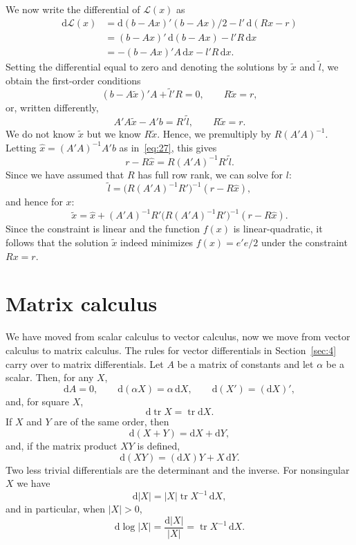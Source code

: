 \documentclass[12pt,a4paper]{article}
\theoremstyle{definition}
\DeclareMathOperator{\tr}{tr}
\newcommand{\dd}{\mathrm{d}}
\begin{document}
We now write the differential of $\mathcal{L}(x)$ as
\begin{align*}
\dd\mathcal{L}(x) &= \dd(b-Ax)'(b-Ax)/2 - l'\, \dd(Rx - r) \\
&= (b-Ax)'\, \dd(b-Ax) - l'R\, \dd x \\
&= -(b-Ax)'A\, \dd x - l'R\, \dd x.
\end{align*}
Setting the differential equal to zero and denoting the solutions by $\tilde{x}$ and $\tilde{l}$, we obtain the first-order conditions
\[
(b - A\tilde{x})'A + \tilde{l}'R = 0, \qquad R\tilde{x} = r,
\]
or, written differently,
\[
A'A\tilde{x} - A'b = R'\tilde{l}, \qquad R\tilde{x} = r.
\]
We do not know $\tilde{x}$ but we know $R\tilde{x}$. Hence, we premultiply by $R(A'A)^{-1}$. Letting $\hat{x} = (A'A)^{-1}A'b$ as in~\eqref{eq:27}, this gives
\[
r - R\hat{x} = R(A'A)^{-1}R'\tilde{l}.
\]
Since we have assumed that $R$ has full row rank, we can solve for $l$:
\[
\tilde{l} = \bigl(R(A'A)^{-1}R'\bigr)^{-1}(r - R\hat{x}),
\]
and hence for $x$:
\begin{equation}\label{eq:29}
\tilde{x} = \hat{x} + (A'A)^{-1}R'\bigl(R(A'A)^{-1}R'\bigr)^{-1}(r - R\hat{x}).
\end{equation}
Since the constraint is linear and the function $f(x)$ is linear-quadratic, it follows that the solution $\tilde{x}$ indeed minimizes $f(x) = e'e/2$ under the constraint $Rx = r$. %

\section{Matrix calculus}\label{sec:7}

We have moved from scalar calculus to vector calculus, now we move from vector calculus to matrix calculus. The rules for vector differentials in Section~\ref{sec:4} carry over to matrix differentials. Let $A$ be a matrix of constants and let $\alpha$ be a scalar. Then, for any $X$,
\[
\dd A = 0, \qquad \dd(\alpha X) = \alpha\, \dd X, \qquad \dd(X') = (\dd X)',
\]
and, for square $X$,
\[
\dd\tr X = \tr \dd X.
\]
If $X$ and $Y$ are of the same order, then
\[
\dd(X + Y) = \dd X + \dd Y,
\]
and, if the matrix product $XY$ is defined,
\[
\dd(XY) = (\dd X)Y + X\, \dd Y.
\]
Two less trivial differentials are the determinant and the inverse. For nonsingular $X$ we have
\begin{equation}\label{eq:30}
\dd|X| = |X| \tr X^{-1}\, \dd X,
\end{equation}
and in particular, when $|X| > 0$,
\begin{equation}\label{eq:31}
\dd\log|X| = \frac{\dd|X|}{|X|} = \tr X^{-1}\, \dd X.
\end{equation}
\end{document}
